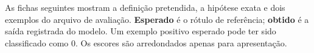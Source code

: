 \begin{caixadica}
As fichas seguintes mostram a definição pretendida, a hipótese exata e dois exemplos do arquivo de avaliação. \textbf{Esperado} é o rótulo de referência; \textbf{obtido} é a saída registrada do modelo. Um exemplo positivo esperado pode ter sido classificado como 0. Os escores são arredondados apenas para apresentação.
\end{caixadica}
